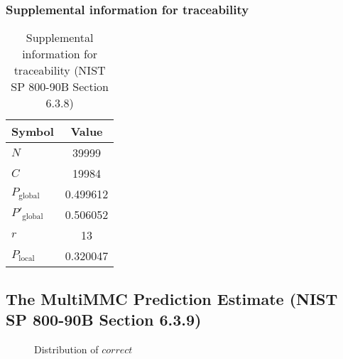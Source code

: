 \documentclass[a3paper,xelatex,english]{bxjsarticle}
\begin{document}
\subsubsection{Supplemental information for traceability}
\renewcommand{\arraystretch}{1.8}
\begin{table}[h]
\caption{Supplemental information for traceability (NIST SP 800-90B Section 6.3.8)}
\begin{center}
\begin{tabular}{|l|c|}
\hline 
\rowcolor{anotherlightblue} %
Symbol				& Value \\ \hline 
$N$				& 39999\\ \hline 
$C$				& 19984\\ \hline 
$P_{\textrm{global}}$				& 0.499612\\ \hline 
$P'_{\textrm{global}}$			& 0.506052\\ \hline 
$r$				& 13\\ \hline 
$P_{\textrm{local}}$ 			& 0.320047\\ \hline
\end{tabular}
\end{center}
\end{table}
\renewcommand{\arraystretch}{1.4}
\clearpage
\subsection{The MultiMMC Prediction Estimate (NIST SP 800-90B Section 6.3.9)}
\begin{figure}[htbp]
\centering

\caption{Distribution of $correct$}
\end{figure}
\end{document}
